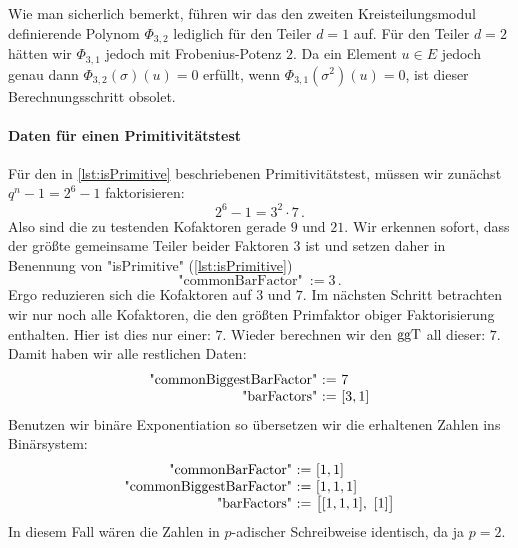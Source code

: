 Wie man sicherlich bemerkt, führen wir das den zweiten Kreisteilungsmodul
definierende Polynom $\Phi_{3,2}$ lediglich für den Teiler $d=1$ auf. Für den
Teiler $d=2$ hätten wir $\Phi_{3,1}$ jedoch mit Frobenius-Potenz $2$. Da ein
Element $u\in E$ jedoch genau dann $\Phi_{3,2}(\sigma)(u) = 0$ erfüllt, wenn 
$\Phi_{3,1}(\sigma^2)(u) = 0$, ist dieser Berechnungsschritt obsolet.

\paragraph{Daten für einen Primitivitätstest}
Für den in \autoref{lst:isPrimitive} beschriebenen Primitivitätstest, müssen
wir zunächst $q^n-1 = 2^6-1$ faktorisieren:
\[ 2^6-1 = 3^2\cdot 7\,.\]
Also sind die zu testenden Kofaktoren gerade $9$ und $21$. Wir erkennen sofort,
dass der größte gemeinsame Teiler beider Faktoren $3$ ist und setzen daher
in Benennung von "isPrimitive" (\autoref{lst:isPrimitive})
\[ \text{"commonBarFactor"}\ := 3\,.\]
Ergo reduzieren sich die Kofaktoren auf $3$ und $7$.
Im nächsten Schritt betrachten wir nur noch alle Kofaktoren, die den größten
Primfaktor obiger Faktorisierung enthalten. Hier ist dies nur einer:
$7$. Wieder berechnen wir den $\operatorname{ggT}$ all dieser: $7$. Damit haben wir alle
restlichen Daten:
\[ \begin{array}{r@{\ :=\ }l}
    \text{"commonBiggestBarFactor"} & 7\\
    \text{"barFactors"} & [3,1]
  \end{array} \]
Benutzen wir binäre Exponentiation so übersetzen wir die erhaltenen Zahlen ins
Binärsystem:
\[ \begin{array}{r@{\ :=\ }l}
    \text{"commonBarFactor"} & [1,1]\\
    \text{"commonBiggestBarFactor"} & [1,1,1]\\
    \text{"barFactors"} & \big[[1,1,1],\ [1]\big]
  \end{array} \]
In diesem Fall wären die Zahlen in $p$-adischer Schreibweise identisch, da ja
$p=2$.

